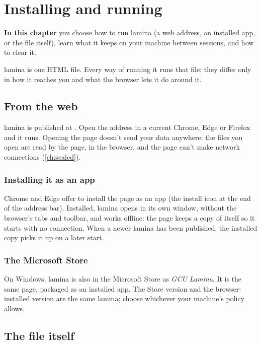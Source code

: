 \chapter{Installing and running}\label{ch:install}
\begin{goals}
\textbf{In this chapter} you choose how to run lamina (a web address, an installed app, or the file
itself), learn what it keeps on your machine between sessions, and how to clear it.
\end{goals}

lamina is one HTML file. Every way of running it runs that file; they differ only in how it reaches you
and what the browser lets it do around it.

\section{From the web}

lamina is published at . Open the address in a current Chrome, Edge or
Firefox and it runs. Opening the page doesn't send your data anywhere: the files you open are read by
the page, in the browser, and the page can't make network connections (\cref{ch:sealed}).

\subsection{Installing it as an app}

Chrome and Edge offer to install the page as an app (the install icon at the end of the address bar).
Installed, lamina opens in its own window, without the browser's tabs and toolbar, and works offline:
the page keeps a copy of itself so it starts with no connection. When a newer lamina has been published,
the installed copy picks it up on a later start.

\subsection{The Microsoft Store}

On Windows, lamina is also in the Microsoft Store as \emph{GCU Lamina}. It is the same page, packaged as
an installed app. The Store version and the browser-installed version are the same lamina; choose
whichever your machine's policy allows.

\section{The file itself}\label{sec:single-file}

